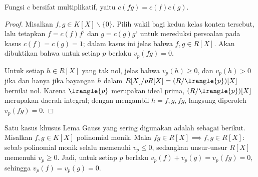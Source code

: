 \begin{lemma}[C.\ F.\ Gauss]\label{prop:Gauss-lemma}
	Fungsi $c$ bersifat multiplikatif, yaitu $c(fg) = c(f)c(g)$.
\end{lemma}
\begin{proof}
	Misalkan $f,g \in K[X] \smallsetminus \{0\}$. Pilih wakil bagi kedua kelas konten tersebut, lalu tetapkan $f = c(f) f^\flat$ dan $g = c(g) g^\flat$ untuk mereduksi persoalan pada kasus $c(f) = c(g) = 1$; dalam kasus ini jelas bahwa $f,g \in R[X]$. Akan dibuktikan bahwa untuk setiap $p$ berlaku $v_p(fg) = 0$.

	Untuk setiap $h \in R[X]$ yang tak nol, jelas bahwa $v_p(h) \geq 0$, dan $v_p(h) > 0$ jika dan hanya jika bayangan $h$ dalam $R[X]/pR[X] = (R/\lrangle{p})[X]$ bernilai nol. Karena $\lrangle{p}$ merupakan ideal prima, $(R/\lrangle{p})[X]$ merupakan daerah integral; dengan mengambil $h=f,g,fg$, langsung diperoleh $v_p(fg)=0$.
\end{proof}

\begin{remark}\label{rem:Gauss-lemma-monic}
	Satu kasus khusus Lema Gauss yang sering digunakan adalah sebagai berikut. Misalkan $f,g \in K[X]$ polinomial monik. Maka $fg \in R[X] \implies f,g \in R[X]$: sebab polinomial monik selalu memenuhi $v_p \leq 0$, sedangkan unsur-unsur $R[X]$ memenuhi $v_p \geq 0$. Jadi, untuk setiap $p$ berlaku $v_p(f) + v_p(g) = v_p(fg) = 0$, sehingga $v_p(f)=v_p(g)=0$.
\end{remark}


